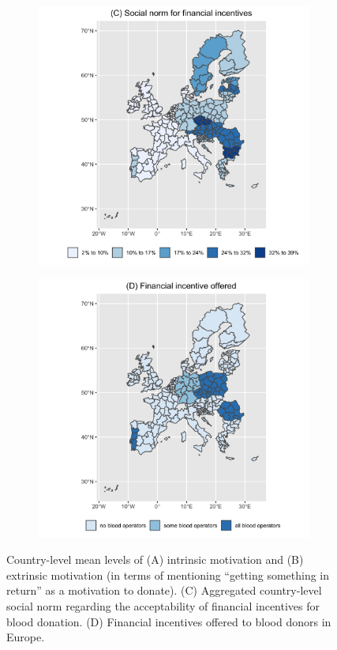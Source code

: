 \documentclass[AER]{AEA}
\begin{document}
\begin{figure}
\newline

\begin{subfigure}{.48\textwidth}
  \centering
  \includegraphics[width=\linewidth]{images/soc_financial_countries.png}  
\end{subfigure}
\begin{subfigure}{.48\textwidth}
  \centering
  \includegraphics[width=\linewidth]{images/WB_incentive_countries.png}  
\end{subfigure}
\caption{Country-level mean levels of (A) intrinsic motivation and (B) extrinsic motivation (in terms of mentioning “getting something in return” as a motivation to donate). (C) Aggregated country-level social norm regarding the acceptability of financial incentives for blood donation. (D) Financial incentives offered to blood donors in Europe.}
\label{fig:map_descr}
\end{figure}
\end{document}
